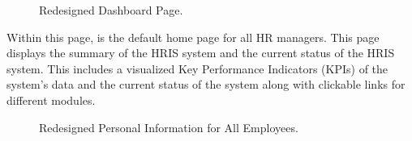     \begin{figure}[H]
        \centering
        \caption{Redesigned Dashboard Page.}
        \label{fig:app-manager}
    \end{figure}

    Within this page, is the default home page for all HR managers. This page displays the summary of the HRIS system and the current status of the HRIS system. This includes a visualized Key Performance Indicators (KPIs) of the system's data and the current status of the system along with clickable links for different modules.

    \begin{figure}[H]
        \centering
        \caption{Redesigned Personal Information for All Employees.}
        \label{fig:app-pi}
    \end{figure}

